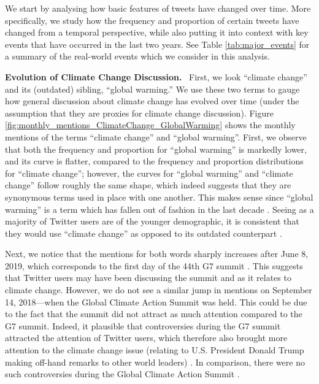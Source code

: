 \documentclass{paper}
\newcommand{\inlineSection}[1]{\vspace{0.5em}\noindent\textbf{#1.}~}
\begin{document}
We start by analysing how basic features of tweets have changed over time. More specifically, we study how the frequency and proportion of certain tweets have changed from a temporal perspective, while also putting it into context with key events that have occurred in the last two years. See Table \ref{tab:major_events} for a summary of the real-world events which we consider in this analysis. 

\inlineSection{Evolution of Climate Change Discussion} First, we look ``climate change'' and its (outdated) sibling, ``global warming.'' We use these two terms to gauge how general discussion about climate change has evolved over time (under the assumption that they are proxies for climate change discussion). Figure \ref{fig:monthly_mentions_ClimateChange_GlobalWarming} shows the monthly mentions of the terms ``climate change'' and ``global warming''. First, we observe that both the frequency and proportion for ``global warming'' is markedly lower, and its curve is flatter, compared to the frequency and proportion distributions for ``climate change''; however, the curves for ``global warming'' and ``climate change'' follow roughly the same shape, which indeed suggests that they are synonymous terms used in place with one another. This makes sense since ``global warming'' is a term which has fallen out of fashion in the last decade \cite{nasa:climate_change_v_global_warming}. Seeing as a majority of Twitter users are of the younger demographic, it is consistent that they would use ``climate change'' as opposed to its outdated counterpart \cite{nasa:climate_change_v_global_warming}. 

Next, we notice that the mentions for both words sharply increases after June 8, 2019, which corresponds to the first day of the 44th G7 summit \cite{wiki:g7_44}. This suggests that Twitter users may have been discussing the summit and as it relates to climate change. However, we do not see a similar jump in mentions on September 14, 2018---when the Global Climate Action Summit was held. This could be due to the fact that the summit did not attract as much attention compared to the G7 summit. Indeed, it plausible that controversies during the G7 summit attracted the attention of Twitter users, which therefore also brought more attention to the climate change issue (relating to U.S. President Donald Trump making off-hand remarks to other world leaders) \cite{wiki:g7_44}. In comparison, there were no such controversies during the Global Climate Action Summit \cite{un_climate_action_summit}.
\end{document}
